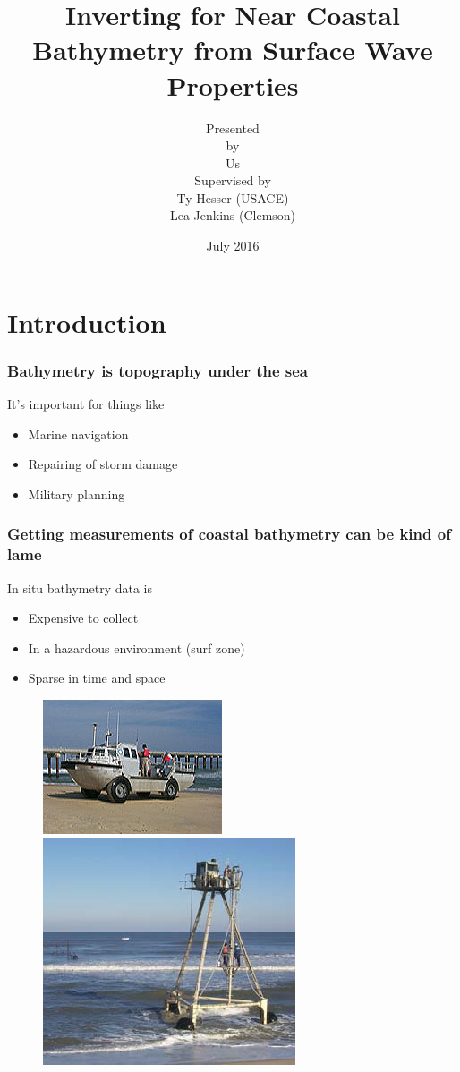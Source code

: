 \documentclass[7pt]{beamer}
\title[Bathymetry Inversion from Waves]{Inverting for Near Coastal Bathymetry from Surface Wave Properties}
\author[USACE Bathymetry]{Presented \\ by\\Us\\Supervised by\\Ty  Hesser (USACE)\\Lea Jenkins (Clemson)}
\institute[IMSM]{Industrial Mathematical and Statistical Modeling}
\date{July 2016}
\begin{document}
 \frame{\titlepage}
\frame{
\frametitle{}
\tableofcontents
}
\section{Introduction }

\begin{frame}
\frametitle{Bathymetry is topography under the sea}
It's important for things like
 \begin{itemize}
\item Marine navigation
\item Repairing of storm damage
\item Military planning
\end{itemize}



\end{frame}

\begin{frame}
 \frametitle{Getting measurements of coastal bathymetry can be kind of lame}
 In situ bathymetry data is
 \begin{itemize}
 \item Expensive to collect
 \item In a hazardous environment (surf zone)
 \item Sparse in time and space
 \end{itemize}

\begin{figure}[h]
\includegraphics[width=.40\linewidth]{img/LARC.jpg}\hfill
\includegraphics[width=.40\linewidth]{img/CRAB2.JPG}
\end{figure}
\end{frame}
\end{document}
